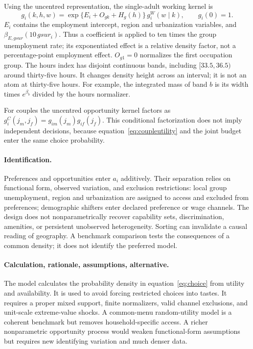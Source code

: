 \documentclass[11pt,a4paper]{article}
\begin{document}
Using the uncentred representation, the single-adult working kernel is
\begin{equation}
g_i(k,h,w)=\exp\{E_i+O_{gk}+H_g(h)\}\,g_i^{W}(w\mid k),
\qquad g_i(0)=1.
\label{eq:opp}
\end{equation}
$E_i$ contains the employment intercept, region and urbanization variables,
and $\beta_{E,gsur}(10\,gsur_i)$. Thus a coefficient is applied to ten times
the group unemployment rate; its exponentiated effect is a relative density
factor, not a percentage-point employment effect. $O_{g1}=0$ normalizes the
first occupation group. The hours index has disjoint continuous bands, including
$[33.5,36.5)$ around thirty-five hours. It changes density height across an
interval; it is not an atom at thirty-five hours. For example, the integrated
mass of band $b$ is its width times $e^{\beta_b}$ divided by the hours
normalizer.

For couples the uncentred opportunity kernel factors as
$g_i^C(j_m,j_f)=g_{im}(j_m)g_{if}(j_f)$. This conditional factorization does not
imply independent decisions, because equation~\eqref{eq:coupleutility} and the
joint budget enter the same choice probability.

\paragraph{Identification.}
Preferences and opportunities enter $a_i$ additively. Their separation relies
on functional form, observed variation, and exclusion restrictions: local group
unemployment, region and urbanization are assigned to access and excluded from
preferences; demographic shifters enter declared preference or wage channels.
The design does not nonparametrically recover capability sets, discrimination,
amenities, or persistent unobserved heterogeneity. Sorting can invalidate a
causal reading of geography. A benchmark comparison tests the consequences of a
common density; it does not identify the preferred model.

\paragraph{Calculation, rationale, assumptions, alternative.}
The model calculates the probability density in equation~\eqref{eq:choice} from
utility and availability. It is used to avoid forcing restricted choices into
tastes. It requires a proper mixed support, finite normalizers, valid channel
exclusions, and unit-scale extreme-value shocks. A common-menu random-utility
model is a coherent benchmark but removes household-specific access. A richer
nonparametric opportunity process would weaken functional-form assumptions but
requires new identifying variation and much denser data.
\end{document}
